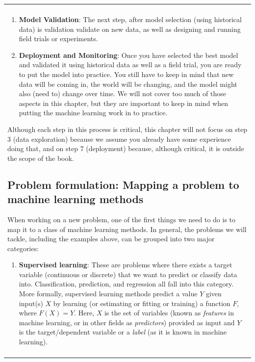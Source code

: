 \documentclass[]{krantz}
\newenvironment{F00}
    {\begin{center}
    \begin{tabular}{|p{0.9\textwidth}|}
    \hline\\
    }
    { 
    \\\\\hline
    \end{tabular} 
    \end{center}
    }
\begin{document}
\begin{F00}
\begin{enumerate}
  models, you need a way to select the model that is the ``best''. This
  part of the chapter will cover methodology to first test the models on
  historical data as well as discuss a variety of evaluation metrics.
  While this chapter will focus mostly on traditionally used metrics,
  Chapter \ref{chap:bias} will expand on this using bias and fairness
  related metrics. It is important to not that sometimes the machine
  learning literature will call this step using historical data, the
  ``validation'' step, but we want to distinguish it here from
  validation, which is the next step.
\item
  \textbf{Model Validation}: The next step, after model selection (using
  historical data) is validation validate on new data, as well as
  designing and running field trials or experiments.
\item
  \textbf{Deployment and Monitoring}: Once you have selected the best
  model and validated it using historical data as well as a field trial,
  you are ready to put the model into practice. You still have to keep
  in mind that new data will be coming in, the world will be changing,
  and the model might also (need to) change over time. We will not cover
  too much of those aspects in this chapter, but they are important to
  keep in mind when putting the machine learning work in to practice.
\end{enumerate}

Although each step in this process is critical, this chapter will not
focus on step 3 (data exploration) because we assume you already have
some experience doing that, and on step 7 (deployment) because, although
critical, it is outside the scope of the book.

\subsection{Problem formulation: Mapping a problem to machine learning
methods}\label{problem-formulation-mapping-a-problem-to-machine-learning-methods}

When working on a new problem, one of the first things we need to do is
to map it to a class of machine learning methods. In general, the
problems we will tackle, including the examples above, can be grouped
into two major categories:

\begin{enumerate}
\def\labelenumi{\arabic{enumi}.}
\item
  \textbf{Supervised learning}: These are problems where there exists a
  target variable (continuous or discrete) that we want to predict or
  classify data into. Classification, prediction, and regression all
  fall into this category. More formally, supervised learning methods
  predict a value \(Y\) given input(s) \(X\) by learning (or estimating
  or fitting or training) a function \(F\), where \(F(X) = Y\). Here,
  \(X\) is the set of variables (known as \emph{features} in machine
  learning, or in other fields as \emph{predictors}) provided as input
  and \(Y\) is the target/dependent variable or a \emph{label} (as it is
  known in machine learning).


\end{enumerate}
\end{F00}
\end{document}
